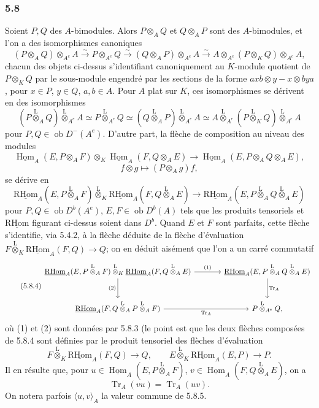 \documentclass[11pt]{article}
\DeclareMathOperator{\Hom}{Hom}
\newcommand{\R}{\mathrm{R}}\newcommand{\RHomCore}{\mathrm{RHom}}
\newcommand{\ob}{\operatorname{ob}}
\providecommand{\RHom}{\RHomCore}
\providecommand{\uRHom}{\underline{\RHom}}
\providecommand{\uHom}{\underline{\Hom}}
\providecommand{\Tr}{\operatorname{Tr}}
\providecommand{\Tr}{\operatorname{Tr}}
\providecommand{\lten}{\overset{\mathrm L}{\otimes}}
\providecommand{\Tr}{\operatorname{Tr}}
\providecommand{\RHom}{\RHomCore}
\providecommand{\Hom}{\operatorname{Hom}}
\providecommand{\ob}{\operatorname{ob}}
\providecommand{\lten}{\overset{\mathrm L}{\otimes}}
\providecommand{\RHom}{\R\mathcal{H}om}
\providecommand{\lten}{\overset{\mathrm L}{\otimes}}
\providecommand{\R}{\mathrm R}
\providecommand{\Tr}{\operatorname{Tr}}
\providecommand{\lten}{\overset{\mathrm L}{\otimes}}
\providecommand{\lten}{\overset{\mathrm L}{\otimes}}
\providecommand{\lten}{\overset{\mathrm L}{\otimes}}
\providecommand{\RHom}{\RHomCore}
\providecommand{\Hom}{\operatorname{Hom}}
\providecommand{\Tr}{\operatorname{Tr}}
\providecommand{\lten}{\overset{\mathrm L}{\otimes}}
\begin{document}
\subsubsection*{5.8}

Soient $P,Q$ des $A$-bimodules. Alors $P\otimes_AQ$ et $Q\otimes_AP$ sont des $A$-bimodules, et l'on a des isomorphismes canoniques
\begin{equation}\tag{5.8.1}
(P\otimes_AQ)\otimes_{A^e}A\xrightarrow{\sim}P\otimes_{A^e}Q\xrightarrow{\sim}(Q\otimes_AP)\otimes_{A^e}A\xrightarrow{\sim}A\otimes_{A^e}(P\otimes_KQ)\otimes_{A^e}A,
\end{equation}
chacun des objets ci-dessus s'identifiant canoniquement au $K$-module quotient de $P\otimes_KQ$ par le sous-module engendré par les sections de la forme $axb\otimes y-x\otimes bya$, pour $x\in P$, $y\in Q$, $a,b\in A$. Pour $A$ plat sur $K$, ces isomorphismes se dérivent en des isomorphismes
\begin{equation}\tag{5.8.2}
(P\lten_AQ)\lten_{A^e}A\simeq P\lten_{A^e}Q\simeq(Q\lten_AP)\lten_{A^e}A\simeq A\lten_{A^e}(P\lten_KQ)\lten_{A^e}A
\end{equation}
pour $P,Q\in\ob D^-(A^e)$. D'autre part, la flèche de composition au niveau des modules
\[
\uHom_A(E,P\otimes_AF)\otimes_K\uHom_A(F,Q\otimes_AE)
\longrightarrow\uHom_A(E,P\otimes_AQ\otimes_AE),
\]
\[
f\otimes g\longmapsto (P\otimes_Ag)f,
\]
se dérive en
\begin{equation}\tag{5.8.3}
\uRHom_A(E,P\lten_AF)\lten_K\uRHom_A(F,Q\lten_AE)
\longrightarrow\uRHom_A(E,P\lten_AQ\lten_AE)
\end{equation}
pour $P,Q\in\ob D^b(A^e)$, $E,F\in\ob D^b(A)$ tels que les produits tensoriels et $\uRHom$ figurant ci-dessus soient dans $D^b$. Quand $E$ et $F$ sont parfaits, cette flèche s'identifie, via 5.4.2, à la flèche déduite de la flèche d'évaluation $F\lten_K\uRHom_A(F,Q)\to Q$; on en déduit aisément que l'on a un carré commutatif
\begin{equation}\tag{5.8.4}
\begin{tikzcd}[column sep=large,row sep=large]
\uRHom_A(E,P\lten_AF)\lten_K\uRHom_A(F,Q\lten_AE) \arrow[r,"(1)"] \arrow[d,"(2)"'] & \uRHom_A(E,P\lten_AQ\lten_AE) \arrow[d,"\Tr_A"]\\
\uRHom_A(F,Q\lten_AP\lten_AF) \arrow[r,"\Tr_A"'] & P\lten_{A^e}Q,
\end{tikzcd}
\end{equation}
où (1) et (2) sont données par 5.8.3 (le point est que les deux flèches composées de 5.8.4 sont définies par le produit tensoriel des flèches d'évaluation
\[
F\lten_K\uRHom_A(F,Q)\longrightarrow Q,\qquad
E\lten_K\uRHom_A(E,P)\longrightarrow P.
\]
Il en résulte que, pour $u\in\uHom_A(E,P\lten_AF)$, $v\in\uHom_A(F,Q\lten_AE)$, on a
\begin{equation}\tag{5.8.5}
\Tr_A(vu)=\Tr_A(uv).
\end{equation}
On notera parfois $\langle u,v\rangle_A$ la valeur commune de 5.8.5.
\end{document}

